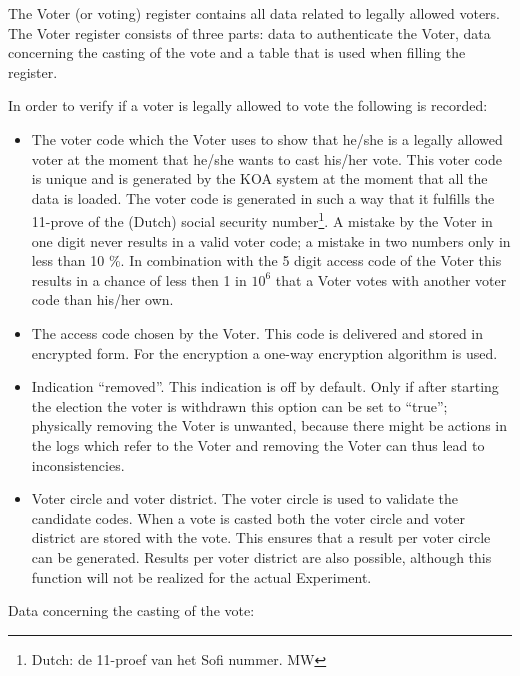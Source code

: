 The Voter (or voting) register contains all data related to legally
allowed voters. The Voter register consists of three parts: data to
authenticate the Voter, data concerning the casting of the vote and a
table that is used when filling the register.

In order to verify if a voter is legally allowed to vote the following
is recorded:

\begin{itemize}
	\item The voter code which the Voter uses to show that he/she
	is a legally allowed voter at the moment that he/she wants to
	cast his/her vote. This voter code is unique and is generated
	by the KOA system at the moment that all the data is
	loaded. The voter code is generated in such a way that it
	fulfills the 11-prove of the (Dutch) social security
	number\footnote{Dutch: de 11-proef van het Sofi nummer. MW}. A
	mistake by the Voter in one digit never results in a valid
	voter code; a mistake in two numbers only in less than 10
	\%. In combination with the 5 digit access code of the Voter
	this results in a chance of less then 1 in $10^6$ that a Voter
	votes with another voter code than his/her own.

	\item The access code chosen by the Voter. This code is
	delivered and stored in encrypted form. For the encryption a
	one-way encryption algorithm is used.

	\item Indication ``removed''. This indication is off by
	default. Only if after starting the election the voter is
	withdrawn this option can be set to ``true''; physically
	removing the Voter is unwanted, because there might be actions
	in the logs which refer to the Voter and removing the Voter
	can thus lead to inconsistencies.

	\item Voter circle and voter district. The voter circle is
	used to validate the candidate codes. When a vote is casted
	both the voter circle and voter district are stored with the
	vote. This ensures that a result per voter circle can be
	generated. Results per voter district are also possible,
	although this function will not be realized for the actual
	Experiment.

\end{itemize}

Data concerning the casting of the vote:

